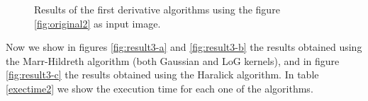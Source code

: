 \documentclass{ipol}
\numberwithin{equation}{section}
\numberwithin{table}{section}
\numberwithin{figure}{section}
\begin{document}
\begin{figure}[h!]
	\centering
	\quad
	
	\caption{Results of the first derivative algorithms using the figure \ref{fig:original2} as input image.}
	\label{fig:result2}
\end{figure}

Now we show in figures \ref{fig:result3-a} and \ref{fig:result3-b} the results obtained using the Marr-Hildreth algorithm (both Gaussian and LoG kernels), and in figure \ref{fig:result3-c} the results obtained using the Haralick algorithm. In table \ref{exectime2} we show the execution time for each one of the algorithms. \\
\end{document}
